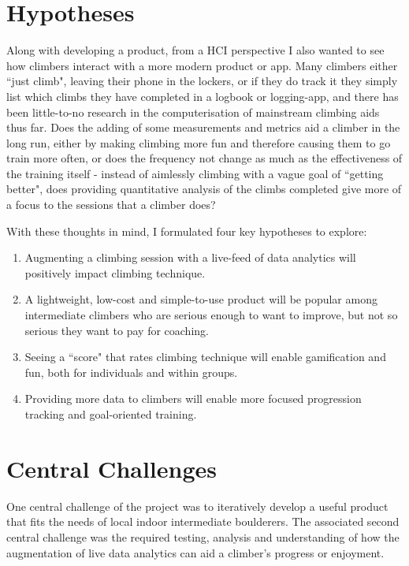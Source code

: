 \section{Hypotheses}
Along with developing a product, from a HCI perspective I also wanted to see how climbers interact with a more modern product or app.
Many climbers either ``just climb", leaving their phone in the lockers, or if they do track it they simply list which climbs they have completed in a logbook or logging-app, and there has been little-to-no research in the computerisation of mainstream climbing aids thus far.
Does the adding of some measurements and metrics aid a climber in the long run,
either by making climbing more fun and therefore causing them to go train more often, or does the frequency not change as much as the effectiveness of the training itself - instead of aimlessly climbing with a vague goal of ``getting better", does providing quantitative analysis of the climbs completed give more of a focus to the sessions that a climber does?


With these thoughts in mind, I formulated four key hypotheses to explore:
\begin{enumerate}
    \item Augmenting a climbing session with a live-feed of data analytics will positively impact climbing technique.
    \item A lightweight, low-cost and simple-to-use product will be popular among intermediate climbers who are serious enough to want to improve, but not so serious they want to pay for coaching.
    \item Seeing a ``score" that rates climbing technique will enable gamification and fun, both for individuals and within groups.
    \item Providing more data to climbers will enable more focused progression tracking and goal-oriented training.
\end{enumerate}



\section{Central Challenges}
One central challenge of the project was to iteratively develop a useful product that fits the needs of local indoor intermediate boulderers.
The associated second central challenge was the required testing, analysis and understanding of how the augmentation of live data analytics can aid a climber's progress or enjoyment.


